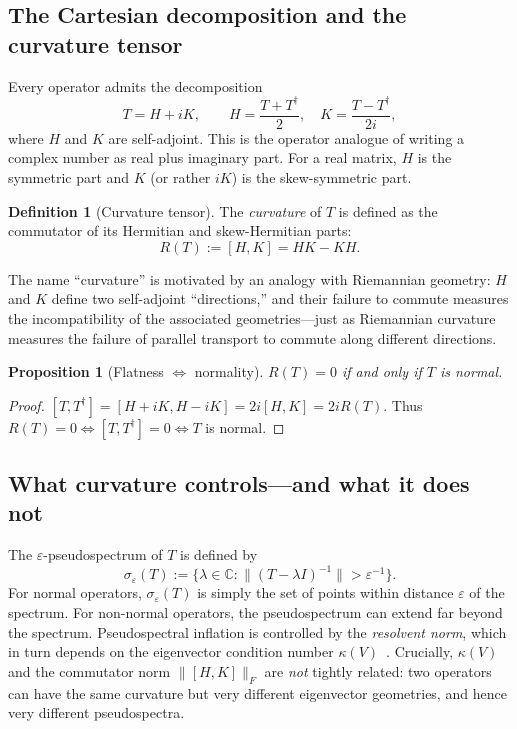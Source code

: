 \documentclass[11pt,a4paper]{article}
\newtheorem{proposition}[theorem]{Proposition}
\theoremstyle{definition}
\newtheorem{definition}[theorem]{Definition}
\begin{document}
\subsection{The Cartesian decomposition and the curvature tensor}

Every operator admits the decomposition
\begin{equation}
\label{eq:cartesian}
  T = H + iK, \qquad H = \frac{T + T^\dagger}{2}, \quad
  K = \frac{T - T^\dagger}{2i},
\end{equation}
where $H$ and $K$ are self-adjoint. This is the operator analogue of
writing a complex number as real plus imaginary part. For a real
matrix, $H$ is the symmetric part and $K$ (or rather $iK$) is the
skew-symmetric part.

\begin{definition}[Curvature tensor]
\label{def:curvature}
The \emph{curvature} of $T$ is defined as the commutator of its
Hermitian and skew-Hermitian parts:
\[
  R(T) := [H, K] = HK - KH.
\]
\end{definition}

The name ``curvature'' is motivated by an analogy with Riemannian
geometry: $H$ and $K$ define two self-adjoint ``directions,'' and their
failure to commute measures the incompatibility of the associated
geometries---just as Riemannian curvature measures the failure of
parallel transport to commute along different directions.

\begin{proposition}[Flatness $\Leftrightarrow$ normality]
\label{prop:flat-normal}
$R(T) = 0$ if and only if $T$ is normal.
\end{proposition}

\begin{proof}
$[T, T^\dagger] = [H + iK, H - iK] = 2i[H, K] = 2iR(T)$.
Thus $R(T) = 0 \Leftrightarrow [T, T^\dagger] = 0 \Leftrightarrow T$ is normal.
\end{proof}

\subsection{What curvature controls---and what it does not}

The $\varepsilon$-pseudospectrum of $T$ is defined by
\[
  \sigma_\varepsilon(T) := \{\lambda \in \mathbb{C} :
  \|(T - \lambda I)^{-1}\| > \varepsilon^{-1}\}.
\]
For normal operators, $\sigma_\varepsilon(T)$ is simply the set of
points within distance $\varepsilon$ of the spectrum. For non-normal
operators, the pseudospectrum can extend far beyond the spectrum.
Pseudospectral inflation is controlled by the \emph{resolvent norm},
which in turn depends on the eigenvector condition number
$\kappa(V)$~\cite{trefethen2005}. Crucially, $\kappa(V)$ and the
commutator norm $\|[H,K]\|_F$ are \emph{not} tightly related:
two operators can have the same curvature but very different
eigenvector geometries, and hence very different pseudospectra.
\end{document}
